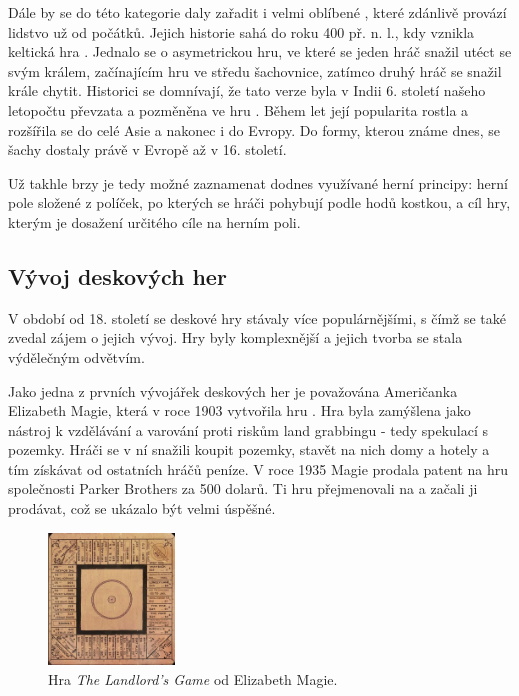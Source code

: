 Dále by se do této kategorie daly zařadit i velmi oblíbené \textbf{}, které zdánlivě provází lidstvo už od počátků. Jejich historie sahá do roku 400 př. n. l., kdy vznikla keltická hra . Jednalo se o asymetrickou hru, ve které se jeden hráč snažil utéct se svým králem, začínajícím hru ve středu šachovnice, zatímco druhý hráč se snažil krále chytit. Historici se domnívají, že tato verze byla v Indii 6. století našeho letopočtu převzata a pozměněna ve hru . Během let její popularita rostla a rozšířila se do celé Asie a nakonec i do Evropy. Do formy, kterou známe dnes, se šachy dostaly právě v Evropě až v 16. století. \cite{chess_com_2023}

Už takhle brzy je tedy možné zaznamenat dodnes využívané herní principy: herní pole složené z políček, po kterých se hráči pohybují podle hodů kostkou, a cíl hry, kterým je dosažení určitého cíle na herním poli. \cite{attia_2018}

\subsection{Vývoj deskových her}
\label{subsec:development}

V období od 18. století se deskové hry stávaly více populárnějšími, s čímž se také zvedal zájem o jejich vývoj. Hry byly komplexnější a jejich tvorba se stala výdělečným odvětvím.

Jako jedna z prvních vývojářek deskových her je považována Američanka Elizabeth Magie, která v roce 1903 vytvořila hru . Hra byla zamýšlena jako nástroj k vzdělávání a varování proti riskům land grabbingu - tedy spekulací s pozemky. Hráči se v ní snažili koupit pozemky, stavět na nich domy a hotely a tím získávat od ostatních hráčů peníze. V roce 1935 Magie prodala patent na hru společnosti Parker Brothers za 500 dolarů. Ti hru přejmenovali na \textbf{} a začali ji prodávat, což se ukázalo být velmi úspěšné. \cite{attia_2018}

\begin{figure}[H]
    \centering
    \includegraphics[width=0.3\textwidth]{figures/theory/landlords-game.png}
    \caption{Hra \textit{The Landlord's Game} od Elizabeth Magie. \cite{attia_2018}}
    \label{fig:landlords-game}
\end{figure}

